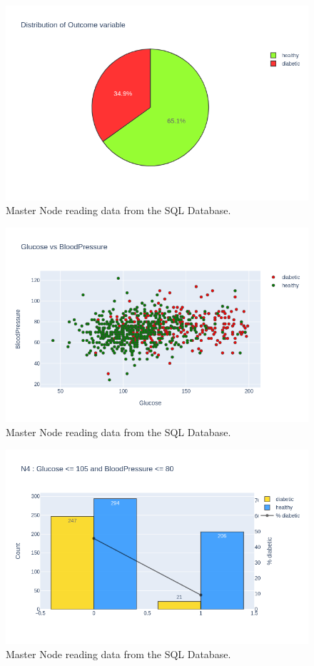 \documentclass[12pt]{article}
\begin{document}
\begin{figure}[ht]
\centering
\includegraphics[width=1\textwidth]{newplot(1).png}
\caption{Master Node reading data from the SQL Database.}
\end{figure}

\begin{figure}[ht]
\centering
\includegraphics[width=1\textwidth]{newplot(20).png}
\caption{Master Node reading data from the SQL Database.}
\end{figure}

\begin{figure}[ht]
\centering
\includegraphics[width=1\textwidth]{newplot(21).png}
\caption{Master Node reading data from the SQL Database.}
\end{figure}
\end{document}
